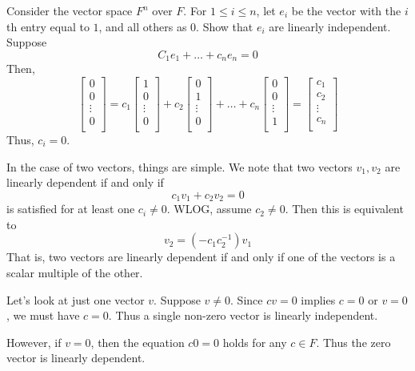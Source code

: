 \documentclass{article}
\begin{document}
\begin{example}
  Consider the vector space $F^n$ over $F$. For $1 \leq i \leq n$, let $e_i$ be the vector with the $i$th entry equal to $1$, and all others as $0$. Show that $e_i$ are linearly independent.
  Suppose \[
    C_1e_1 + \dots + c_ne_n = 0
  \]
  Then,
  \[
    \begin{bmatrix}
      0\\ 0\\ \vdots \\ 0\\
    \end{bmatrix}
    = c_1
    \begin{bmatrix}
      1\\ 0\\ \vdots \\ 0\\
    \end{bmatrix} + c_2
    \begin{bmatrix}
      0\\ 1\\ \vdots \\ 0\\
    \end{bmatrix} + \dots + c_n
    \begin{bmatrix}
      0\\ 0\\ \vdots \\ 1\\
    \end{bmatrix} =
    \begin{bmatrix}
      c_1\\ c_2\\ \vdots \\ c_n\\
    \end{bmatrix}
  \]
  Thus, $c_i = 0$.
\end{example}
\begin{remark}
  In the case of two vectors, things are simple. We note that two vectors $v_1, v_2$ are linearly dependent if and only if \[
    c_1v_1 + c_2v_2 = 0
  \]
  is satisfied for at least one $c_i \neq 0$. WLOG, assume $c_2 \neq 0$. Then this is equivalent to \[
    v_2 = (-c_1c_2^{-1})v_1
  \]
  That is, two vectors are linearly dependent if and only if one of the vectors is a scalar multiple of the other.
\end{remark}
\begin{remark}
  Let's look at just one vector $v$. Suppose $v \neq 0$. Since $cv = 0$ implies $c = 0$ or $v = 0$, we must have $c=0$. Thus a single non-zero vector is linearly independent.

  However, if $v = 0$, then the equation $c0 = 0$ holds for any $c \in F$. Thus the zero vector is linearly dependent.
\end{remark}
\end{document}
